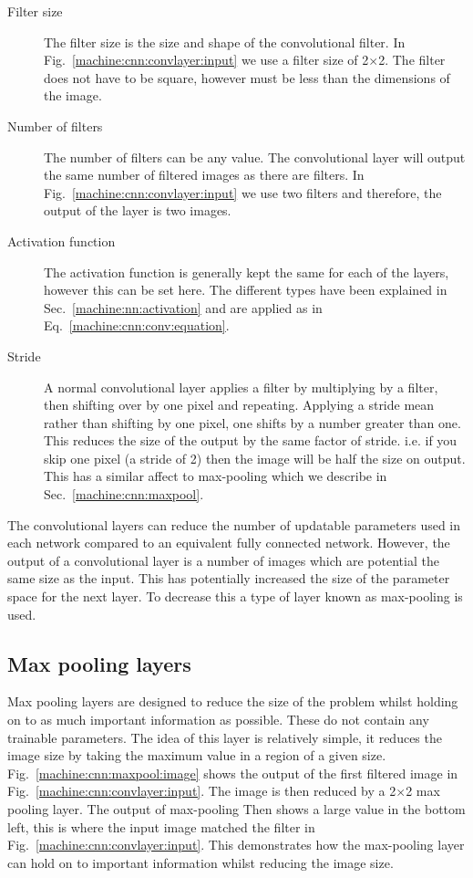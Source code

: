 \begin{description}
\item[Filter size] The filter size is the size and shape of the convolutional filter. In Fig.~\ref{machine:cnn:convlayer:input} we use a filter size of 2$\times$2. The filter does not have to be square, however must be less than the dimensions of the image.

\item[Number of filters] The number of filters can be any value. The convolutional layer will output the same number of filtered images as there are filters. In Fig.~\ref{machine:cnn:convlayer:input} we use two filters and therefore, the output of the layer is two images.

\item[Activation function] The activation function is generally kept the same for each of the layers, however this can be set here. The different types have been explained in Sec.~\ref{machine:nn:activation} and are applied as in Eq.~\ref{machine:cnn:conv:equation}.

\item[Stride] A normal convolutional layer applies a filter by multiplying by a filter, then shifting over by one pixel and repeating. Applying a stride mean rather than shifting by one pixel, one shifts by a number greater than one. This reduces the size of the output by the same factor of stride. i.e. if you skip one pixel (a stride of 2) then the image will be half the size on output. This has a similar affect to max-pooling which we describe in Sec.~\ref{machine:cnn:maxpool}.  
\end{description}

The convolutional layers can reduce the number of updatable parameters used in each network compared to an equivalent fully connected network.
However, the output of a convolutional layer is a number of images which are potential the same size as the input. 
This has potentially increased the size of the parameter space for the next layer.
To decrease this a type of layer known as max-pooling is used.

\subsection{\label{machine:cnn:maxpool}Max pooling layers}

Max pooling layers are designed to reduce the size of the problem whilst holding on to as much important information as possible.
These do not contain any trainable parameters.
The idea of this layer is relatively simple, it reduces the image size by taking the maximum value in a region of a given size.
Fig.~\ref{machine:cnn:maxpool:image} shows the output of the first filtered image in Fig.~\ref{machine:cnn:convlayer:input}.
The image is then reduced by a 2$\times$2 max pooling layer.
The output of max-pooling Then shows a large value in the bottom left, this is where the input image matched the filter in Fig.~\ref{machine:cnn:convlayer:input}.
This demonstrates how the max-pooling layer can hold on to important information whilst reducing the image size.

